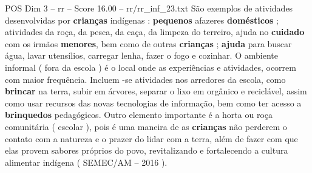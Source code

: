 \begin{textsample}{POS Dim 3 – rr – Score 16.00 – rr/rr\_inf\_23.txt}
São exemplos de atividades desenvolvidas por \textbf{crianças} indígenas : \textbf{pequenos} afazeres \textbf{domésticos} ; atividades da roça, da pesca, da caça, da limpeza do terreiro, ajuda no \textbf{cuidado} com os irmãos \textbf{menores}, bem como de outras \textbf{crianças} ; \textbf{ajuda} para buscar água, lavar utensílios, carregar lenha, fazer o fogo e cozinhar.
O ambiente informal ( fora da escola ) é o local onde as experiências e atividades, ocorrem com maior frequência.
Incluem -se atividades nos arredores da escola, como \textbf{brincar} na terra, subir em árvores, separar o lixo em orgânico e reciclável, assim como usar recursos das novas tecnologias de informação, bem como ter acesso a \textbf{brinquedos} pedagógicos.
Outro elemento importante é a horta ou roça comunitária ( escolar ), pois é uma maneira de as \textbf{crianças} não perderem o contato com a natureza e o prazer do lidar com a terra, além de fazer com que elas provem sabores próprios do povo, revitalizando e fortalecendo a cultura alimentar indígena ( SEMEC/AM – 2016 ).

\end{textsample}
